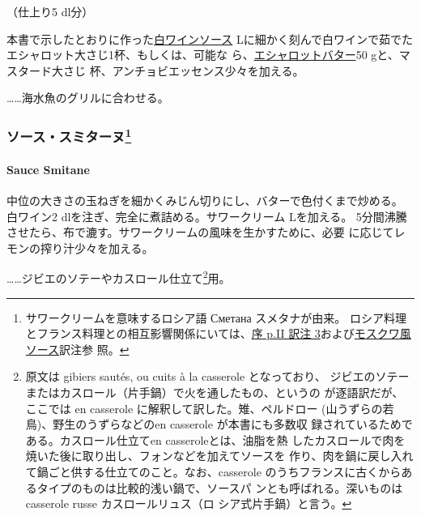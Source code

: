 \begin{recette}
（仕上り5 dl分）

本書で示したとおりに作った\protect\hyperlink{sauce-vin-blanc}{白ワインソース}\undemi{}
Lに細かく刻んで白ワインで茹でたエシャロット大さじ1杯、もしくは、可能な
ら、\protect\hyperlink{beurre-d-echalote}{エシャロットバター}50
gと、マスタード大さじ \undemi{}杯、アンチョビエッセンス少々を加える。

\ldots{}\ldots{}海水魚のグリルに合わせる。

\maeaki

\hypertarget{ux30bdux30fcux30b9ux30b9ux30dfux30bfux30fcux30cc127}{%
\subsubsection[ソース・スミターヌ]{\texorpdfstring{ソース・スミターヌ\footnote{サワークリームを意味するロシア語
  Сметана スメタナが由来。
  ロシア料理とフランス料理との相互影響関係にいては、\protect\hyperlink{service-russe}{序
  p.II 訳注
  3}および\protect\hyperlink{sauce-moscovite}{モスクワ風ソース}訳注参
  照。}}{ソース・スミターヌ}}\label{ux30bdux30fcux30b9ux30b9ux30dfux30bfux30fcux30cc127}}

\hypertarget{sauce-smitane}{%
\paragraph{Sauce Smitane}\label{sauce-smitane}}


中位の大きさの玉ねぎを細かくみじん切りにし、バターで色付くまで炒める。
白ワイン2 dlを注ぎ、完全に煮詰める。サワークリーム\undemi{} Lを加える。
5分間沸騰させたら、布で漉す。サワークリームの風味を生かすために、必要
に応じてレモンの搾り汁少々を加える。

\ldots{}\ldots{}ジビエのソテーやカスロール仕立て\footnote{原文は gibiers
  sautés, ou cuits à la casserole となっており、
  ジビエのソテーまたはカスロール（片手鍋）で火を通したもの、というの
  が逐語訳だが、ここでは en casserole に解釈して訳した。雉、ペルドロー
  (山うずらの若鳥)、野生のうずらなどのen casserole が本書にも多数収
  録されているためである。カスロール仕立てen casseroleとは、油脂を熱
  したカスロールで肉を焼いた後に取り出し、フォンなどを加えてソースを
  作り、肉を鍋に戻し入れて鍋ごと供する仕立てのこと。なお、casserole
  のうちフランスに古くからあるタイプのものは比較的浅い鍋で、ソースパ
  ンとも呼ばれる。深いものはcasserole russe カスロールリュス（ロ
  シア式片手鍋）と言う。}用。


\end{recette}
